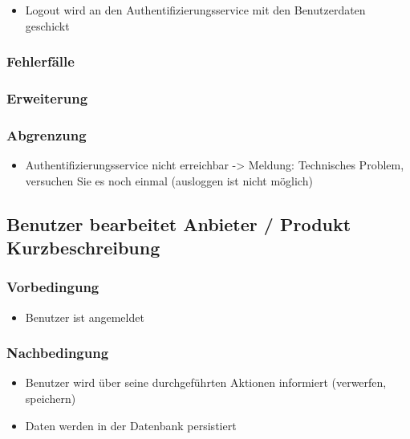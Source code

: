 \documentclass[a4paper,12pt]{article}
\begin{document}
\begin{itemize}
\item
  Logout wird an den Authentifizierungsservice mit den Benutzerdaten
  geschickt
\end{itemize}

\subsubsection{Fehlerfälle}\label{fehlerfalle-1}

\subsubsection{Erweiterung}\label{erweiterung}

\subsubsection{Abgrenzung}\label{abgrenzung}

\begin{itemize}
\item
  Authentifizierungsservice nicht erreichbar -\textgreater{} Meldung:
  Technisches Problem, versuchen Sie es noch einmal (ausloggen ist nicht
  möglich)
\end{itemize}

\subsection{Benutzer bearbeitet Anbieter / Produkt Kurzbeschreibung}
\subsubsection{Vorbedingung}

\begin{itemize}
\item
  Benutzer ist angemeldet
\end{itemize}

\subsubsection{Nachbedingung}\label{nachbedingung-2}

\begin{itemize}
\item
  Benutzer wird über seine durchgeführten Aktionen informiert
  (verwerfen, speichern)
\item
  Daten werden in der Datenbank persistiert
\end{itemize}
\end{document}
